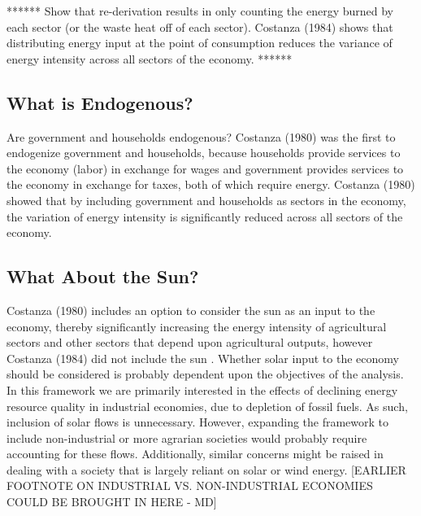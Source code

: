\documentclass[authoryear,preprint,review,12pt]{elsarticle}
\begin{document}
****** Show that re-derivation results in only counting the energy burned by each sector (or the waste heat off of each sector). Costanza (1984) shows that distributing energy input at the point of consumption reduces the variance of energy intensity across all sectors of the economy. ******


\subsection{What is Endogenous?}

Are government and households endogenous? Costanza (1980) was the first to endogenize government and households, because households provide services to the economy (labor) in exchange for wages and government provides services to the economy in exchange for taxes, both of which require energy. Costanza (1980) showed that by including government and households as sectors in the economy, the variation of energy intensity is significantly reduced across all sectors of the economy. 


\subsection{What About the Sun?}

Costanza (1980) includes an option to consider the sun as an input to the economy, thereby significantly increasing the energy intensity of agricultural sectors and other sectors that depend upon agricultural outputs, however Costanza (1984) did not include the sun \cite{Costanza1980, Costanza1984}. Whether solar input to the economy should be considered is probably dependent upon the objectives of the analysis. In this framework we are primarily interested in the effects of declining energy resource quality in industrial economies, due to depletion of fossil fuels. As such, inclusion of solar flows is unnecessary. However, expanding the framework to include non-industrial or more agrarian societies would probably require accounting for these flows. Additionally, similar concerns might be raised in dealing with a society that is largely reliant on solar or wind energy.   [EARLIER FOOTNOTE ON INDUSTRIAL VS. NON-INDUSTRIAL ECONOMIES COULD BE BROUGHT IN HERE - MD]
\end{document}
